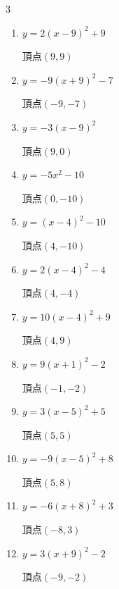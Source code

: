 \begin{multicols}{3}
\begin{enumerate}
  \item $\displaystyle y=2\left( x-9\right)^{2}+9$

        $\displaystyle 頂点\left( 9 , 9 \right)$

  \item $\displaystyle y=-9\left( x+9\right)^{2}-7$

        $\displaystyle 頂点\left( -9 , -7 \right)$

  \item $\displaystyle y=-3\left( x-9\right)^{2}$

        $\displaystyle 頂点\left( 9 , 0 \right)$

  \item $\displaystyle y=-5x^{2}-10$

        $\displaystyle 頂点\left( 0 , -10 \right)$

  \item $\displaystyle y=\left( x-4\right)^{2}-10$

        $\displaystyle 頂点\left( 4 , -10 \right)$

  \item $\displaystyle y=2\left( x-4\right)^{2}-4$

        $\displaystyle 頂点\left( 4 , -4 \right)$

  \item $\displaystyle y=10\left( x-4\right)^{2}+9$

        $\displaystyle 頂点\left( 4 , 9 \right)$

  \item $\displaystyle y=9\left( x+1\right)^{2}-2$

        $\displaystyle 頂点\left( -1 , -2 \right)$

  \item $\displaystyle y=3\left( x-5\right)^{2}+5$

        $\displaystyle 頂点\left( 5 , 5 \right)$

  \item $\displaystyle y=-9\left( x-5\right)^{2}+8$

        $\displaystyle 頂点\left( 5 , 8 \right)$

  \item $\displaystyle y=-6\left( x+8\right)^{2}+3$

        $\displaystyle 頂点\left( -8 , 3 \right)$

  \item $\displaystyle y=3\left( x+9\right)^{2}-2$

        $\displaystyle 頂点\left( -9 , -2 \right)$


\end{enumerate}
\end{multicols}
